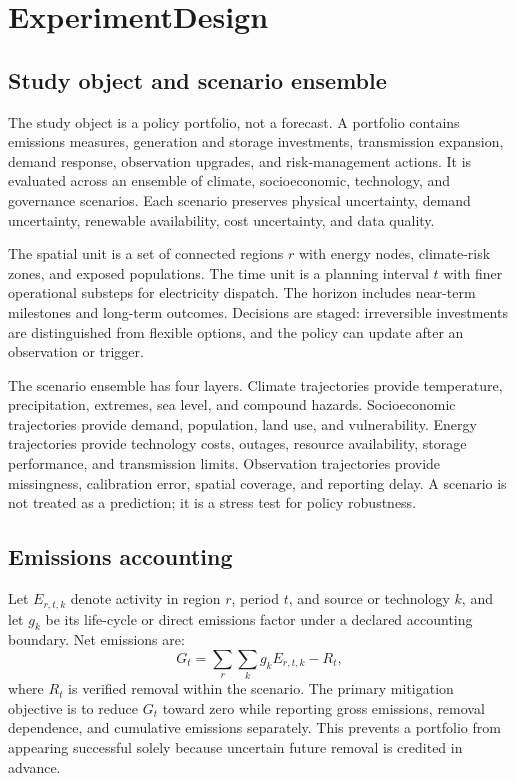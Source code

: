 \documentclass[conference]{IEEEtran}
\begin{document}
\section{ExperimentDesign}
\subsection{Study object and scenario ensemble}
The study object is a policy portfolio, not a forecast. A portfolio contains emissions measures, generation and storage investments, transmission expansion, demand response, observation upgrades, and risk-management actions. It is evaluated across an ensemble of climate, socioeconomic, technology, and governance scenarios. Each scenario preserves physical uncertainty, demand uncertainty, renewable availability, cost uncertainty, and data quality.

The spatial unit is a set of connected regions $r$ with energy nodes, climate-risk zones, and exposed populations. The time unit is a planning interval $t$ with finer operational substeps for electricity dispatch. The horizon includes near-term milestones and long-term outcomes. Decisions are staged: irreversible investments are distinguished from flexible options, and the policy can update after an observation or trigger.

The scenario ensemble has four layers. Climate trajectories provide temperature, precipitation, extremes, sea level, and compound hazards. Socioeconomic trajectories provide demand, population, land use, and vulnerability. Energy trajectories provide technology costs, outages, resource availability, storage performance, and transmission limits. Observation trajectories provide missingness, calibration error, spatial coverage, and reporting delay. A scenario is not treated as a prediction; it is a stress test for policy robustness.

\subsection{Emissions accounting}
Let $E_{r,t,k}$ denote activity in region $r$, period $t$, and source or technology $k$, and let $g_k$ be its life-cycle or direct emissions factor under a declared accounting boundary. Net emissions are:
\begin{equation}
G_t=\sum_r\sum_k g_k E_{r,t,k}-R_t,
\label{eq:emissions}
\end{equation}
where $R_t$ is verified removal within the scenario. The primary mitigation objective is to reduce $G_t$ toward zero while reporting gross emissions, removal dependence, and cumulative emissions separately. This prevents a portfolio from appearing successful solely because uncertain future removal is credited in advance.
\end{document}
